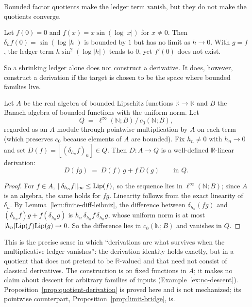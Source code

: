 Bounded factor quotients make the ledger term vanish, but they do not make the quotients converge.

\begin{example}\label{ex:bounded-not-convergent}
Let $f(0)=0$ and $f(x)=x\sin(\log|x|)$ for $x\ne 0$. Then $\delta_hf(0)=\sin(\log|h|)$ is bounded by $1$ but has no limit as $h\to 0$. With $g=f$, the ledger term $h\sin^2(\log|h|)$ tends to $0$, yet $f'(0)$ does not exist.
\end{example}

So a shrinking ledger alone does not construct a derivative.
It does, however, construct a derivation if the target is chosen to be the space where bounded families live.

\begin{proposition}\label{prop:quotient-derivation}
Let $A$ be the real algebra of bounded Lipschitz functions $\mathbb R\to\mathbb R$ and $B$ the Banach algebra of bounded functions with the uniform norm. Let
\[
  Q\;=\;\ell^\infty(\mathbb N;B)\,/\,c_0(\mathbb N;B),
\]
regarded as an $A$-module through pointwise multiplication by $A$ on each term (which preserves $c_0$ because elements of $A$ are bounded).
Fix $h_n\ne 0$ with $h_n\to 0$ and set $D(f)=[(\delta_{h_n}f)_n]\in Q$. Then $D:A\to Q$ is a well-defined $\mathbb R$-linear derivation:
\[
  D(fg)\;=\;D(f)\,g+f\,D(g)\qquad\text{in }Q.
\]
\end{proposition}

\begin{proof}
For $f\in A$, $\|\delta_{h_n}f\|_\infty\le\mathrm{Lip}(f)$, so the sequence lies in $\ell^\infty(\mathbb N;B)$; since $A$ is an algebra, the same holds for $fg$. Linearity follows from the exact linearity of $\delta_h$. By Lemma~\ref{lem:finite-diff-leibniz}, the difference between $\delta_{h_n}(fg)$ and $(\delta_{h_n}f)g+f(\delta_{h_n}g)$ is $h_n\,\delta_{h_n}f\,\delta_{h_n}g$, whose uniform norm is at most $|h_n|\mathrm{Lip}(f)\mathrm{Lip}(g)\to 0$. So the difference lies in $c_0(\mathbb N;B)$ and vanishes in $Q$.
\end{proof}

This is the precise sense in which ``derivations are what survives when the multiplicative ledger vanishes'': the derivation identity holds exactly, but in a quotient that does not pretend to be $\mathbb R$-valued and that need not consist of classical derivatives.
The construction is on fixed functions in $A$; it makes no claim about descent for arbitrary families of inputs (Example~\ref{ex:no-descent}).
Proposition~\ref{prop:quotient-derivation} is proved here and is not mechanized; its pointwise counterpart, Proposition~\ref{prop:limit-bridge}, is.

